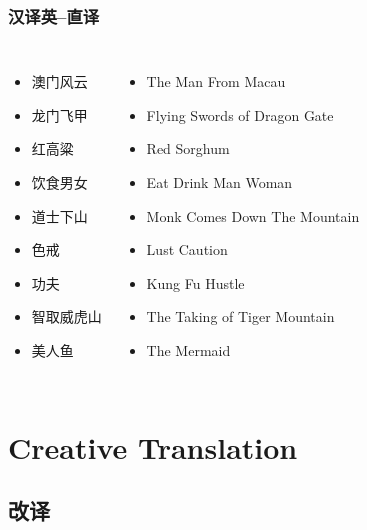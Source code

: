 \documentclass[xcolor=x11names,compress]{ctexbeamer}
\begin{document}
\begin{frame}[fragile]
\frametitle{汉译英--直译}
\begin{columns}

\begin{itemize}
\item 澳门风云
\item 龙门飞甲
\item 红高粱
\item 饮食男女
\item 道士下山
\item 色戒
\item 功夫
\item 智取威虎山
\item 美人鱼
\end{itemize}
\pause
{}
\begin{itemize}
\item The Man From Macau
\item Flying Swords of Dragon Gate
\item Red Sorghum
\item Eat Drink Man Woman 
\item Monk Comes Down The Mountain
\item Lust Caution
\item Kung Fu Hustle
\item The Taking of Tiger Mountain
\item The Mermaid
\end{itemize}
\end{columns}
\end{frame}

\section[Creative Translation]{Creative Translation}
\subsection{改译}
\end{document}
